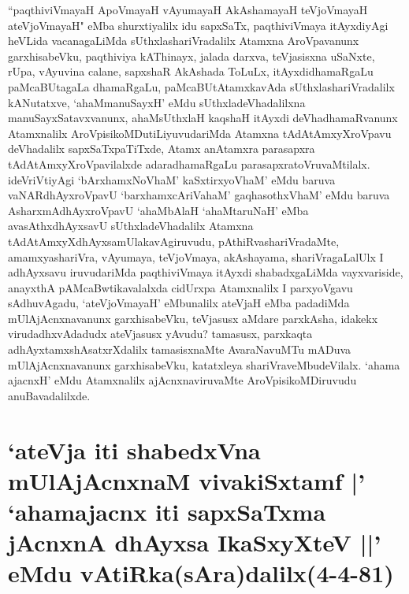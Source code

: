 \begin{artha}
``paqthiviVmayaH ApoVmayaH vAyumayaH AkAshamayaH teVjoVmayaH ateVjoVmayaH" eMba shurxtiyalilx idu sapxSaTx, paqthiviVmaya itAyxdiyAgi heVLida vacanagaLiMda sUthxlashariVradalilx Atamxna AroVpavanunx garxhisabeVku, paqthiviya kAThinayx, jalada darxva, teVjasisxna uSaNxte, rUpa, vAyuvina calane, sapxshaR AkAshada ToLuLx, itAyxdidhamaRgaLu paMcaBUtagaLa dhamaRgaLu, paMcaBUtAtamxkavAda sUthxlashariVradalilx kANutatxve, `ahaMmanuSayxH' eMdu sUthxladeVhadalilxna manuSayxSatavxvanunx, ahaMsUthxlaH kaqshaH itAyxdi deVhadhamaRvanunx Atamxnalilx AroVpisikoMDutiLiyuvudariMda Atamxna tAdAtAmxyXroVpavu deVhadalilx sapxSaTxpaTiTxde, Atamx anAtamxra parasapxra tAdAtAmxyXroVpavilalxde adaradhamaRgaLu parasapxratoVruvaMtilalx. ideVriVtiyAgi `bArxhamxNoVhaM' kaSxtirxyoVhaM' eMdu baruva vaNARdhAyxroVpavU `barxhamxcAriVahaM' gaqhasothxV\s haM' eMdu baruva AsharxmAdhAyxroVpavU `ahaMbAlaH `ahaMtaruNaH' eMba avasAthxdhAyxsavU sUthxladeVhadalilx Atamxna tAdAtAmxyXdhAyxsamUlakavAgiruvudu, pAthiRvashariVradaMte, amamxyashariVra, vAyumaya,  teVjoVmaya, akAshayama, shariVragaLalUlx I adhAyxsavu iruvudariMda paqthiviVmaya itAyxdi shabadxgaLiMda vayxvariside, anayxthA pAMcaBwtikavalalxda cidUrxpa Atamxnalilx I parxyoVgavu sAdhuvAgadu, `ateVjoVmayaH' eMbunalilx ateVjaH eMba padadiMda mUlAjAcnxnavanunx garxhisabeVku, teVjasusx aMdare parxkAsha, idakekx virudadhxvAdadudx ateVjasusx yAvudu? tamasusx, parxkaqta adhAyxtamxshAsatxrXdalilx tamasisxnaMte AvaraNavuMTu mADuva mUlAjAcnxnavanunx garxhisabeVku, katatxleya shariVraveMbudeVilalx. `ahama ajacnxH' eMdu Atamxnalilx ajAcnxnaviruvaMte AroVpisikoMDiruvudu anuBavadalilxde.
\end{artha}

\section*{`ateVja iti shabedxVna mUlAjAcnxnaM vivakiSxtamf |' `ahamajacnx iti sapxSaTxma jAcnxnA dhAyxsa IkaSxyXteV ||' eMdu vAtiRka(sAra)dalilx(4-4-81)}


